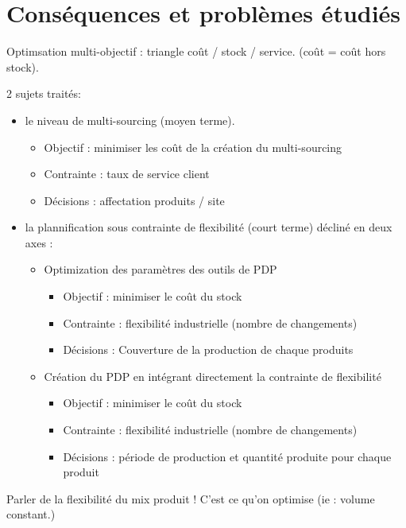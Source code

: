 \section{Conséquences et problèmes étudiés}


Optimsation multi-objectif : triangle coût / stock / service. (coût = coût hors stock).


2 sujets traités:
\begin{itemize}
  \item le niveau de multi-sourcing (moyen terme).
  \begin{itemize}
    \item Objectif : minimiser les coût de la création du multi-sourcing
    \item Contrainte : taux de service client
    \item Décisions : affectation produits / site
  \end{itemize}
  \item la plannification sous contrainte de flexibilité (court terme) décliné en deux axes :
  \begin{itemize}
    \item Optimization des paramètres des outils de PDP
    \begin{itemize}
      \item Objectif : minimiser le coût du stock
      \item Contrainte : flexibilité industrielle (nombre de changements)
      \item Décisions : Couverture de la production de chaque produits
    \end{itemize}
    \item Création du PDP en intégrant directement la contrainte de flexibilité
    \begin{itemize}
      \item Objectif : minimiser le coût du stock
      \item Contrainte : flexibilité industrielle (nombre de changements)
      \item Décisions : période de production et quantité produite pour chaque produit
    \end{itemize}
  \end{itemize}
\end{itemize}


Parler de la flexibilité du mix produit ! C'est ce qu'on optimise (ie : volume constant.)